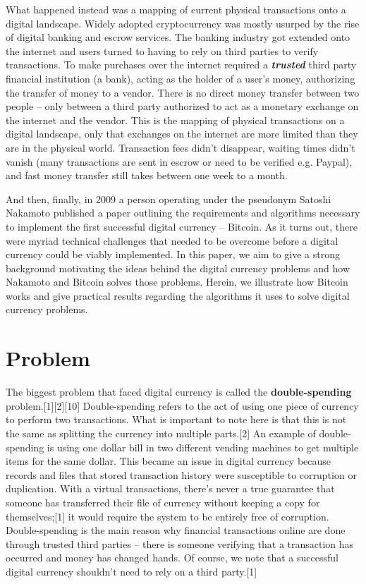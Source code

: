 \documentclass[pdftex,11pt]{article}
\begin{document}
What happened instead was a mapping of current physical transactions onto a digital landscape. Widely adopted cryptocurrency was mostly usurped by the rise of digital banking and escrow services.  The banking industry got extended onto the internet and users turned to having to rely on third parties to verify transactions. To make purchases over the internet required a {\bf \em trusted} third party financial institution (a bank), acting as the holder of a user's money, authorizing the transfer of money to a vendor. There is no direct money transfer between two people -- only between a third party authorized to act as a monetary exchange on the internet and the vendor. This is the mapping of physical transactions on a digital landscape, only that exchanges on the internet are more limited than they are in the physical world. Transaction fees didn't disappear, waiting times didn't vanish (many transactions are sent in escrow or need to be verified e.g. Paypal), and fast money transfer still takes between one week to a month.

And then, finally, in 2009 a person operating under the pseudonym Satoshi Nakamoto published a paper outlining the requirements and algorithms necessary to implement the first successful digital currency -- Bitcoin. As it turns out, there were myriad technical challenges that needed to be overcome before a digital currency could be viably implemented. In this paper, we aim to give a strong background motivating the ideas behind the digital currency problems and how Nakamoto and Bitcoin solves those problems. Herein, we  illustrate how Bitcoin works and give practical results regarding the algorithms it uses to solve digital currency problems. 

\section{Problem}
The biggest problem that faced digital currency is called the {\bf double-spending} problem.[1][2][10] Double-spending refers to the act of using one piece of currency to perform two transactions. What is important to note here is that this is not the same as splitting the currency into multiple parts.[2] An example of double-spending is using one dollar bill in two different vending machines to get multiple items for the same dollar. This became an issue in digital currency because records and files that stored transaction history were susceptible to corruption or duplication. With a virtual transactions, there's never a true guarantee that someone has transferred their file of currency without keeping a copy for themselves;[1] it would require the system to be entirely free of corruption. Double-spending is the main reason why financial transactions online are done through trusted third parties -- there is someone verifying that a transaction has occurred and money has changed hands. Of course, we note that a successful digital currency shouldn't need to rely on a third party.[1]
\end{document}
